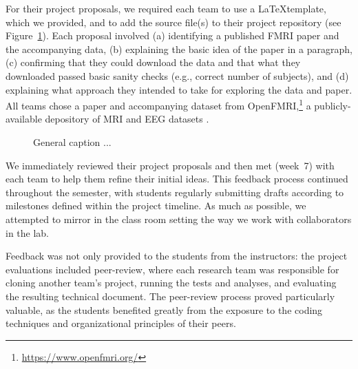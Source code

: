 
For their project proposals, we required each team to use a \LaTeX template,
which we provided, and to add the source file(s) to their project repository
(see Figure~\ref{fig:repo}).
Each proposal involved
(a) identifying a published FMRI paper and the accompanying data,
(b) explaining the basic idea of the paper in a paragraph,
(c) confirming that they could download the data and that what they
downloaded passed basic sanity checks (e.g., correct number of subjects), and
(d) explaining what approach they intended to take for exploring
the data and paper.
All teams chose a paper and accompanying dataset from
OpenFMRI,\footnote{\url{https://www.openfmri.org/}} a publicly-available
depository of MRI and EEG datasets
\citep{poldrack2013toward,poldrack2015openfmri}.


\begin{figure}
\centering

\caption{General caption ...}
\label{fig:repo}
\end{figure}

We immediately reviewed their project proposals and then met
(week~7) with each team to help them refine their initial ideas.
This feedback process continued throughout the semester, with students
regularly submitting drafts according to milestones defined within the project
timeline.
As much as possible, we attempted to mirror in the class room setting
the way we work with collaborators in the lab.


Feedback was not only provided to the students from the instructors: the
project evaluations included peer-review, where each research team was
responsible for cloning another team's project, running the tests and analyses,
and evaluating the resulting technical document.
The peer-review process proved particularly valuable, as the students 
benefited greatly from the exposure to the coding techniques and 
organizational principles of their peers.

